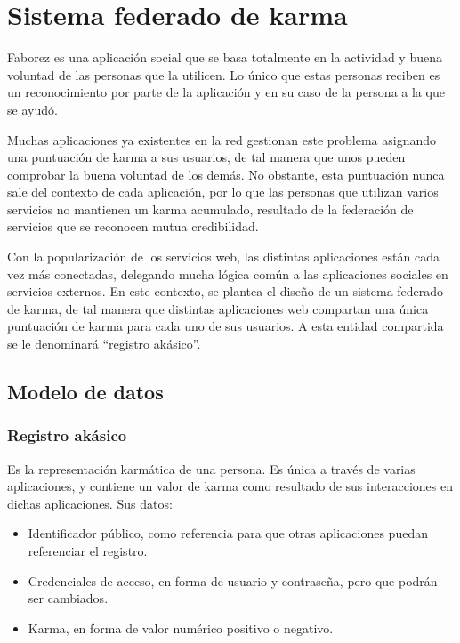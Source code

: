 \documentclass[main]{subfiles}
\begin{document}
\chapter{Sistema federado de karma}
\label{sec:karma}

Faborez es una aplicación social que se basa totalmente en la actividad y buena voluntad de las personas que la utilicen. Lo único que estas personas reciben es un reconocimiento por parte de la aplicación y en su caso de la persona a la que se ayudó.

Muchas aplicaciones ya existentes en la red gestionan este problema asignando una puntuación de karma a sus usuarios, de tal manera que unos pueden comprobar la buena voluntad de los demás. No obstante, esta puntuación nunca sale del contexto de cada aplicación, por lo que las personas que utilizan varios servicios no mantienen un karma acumulado, resultado de la federación de servicios que se reconocen mutua credibilidad.

Con la popularización de los servicios web, las distintas aplicaciones están cada vez más conectadas, delegando mucha lógica común a las aplicaciones sociales en servicios externos. En este contexto, se plantea el diseño de un sistema federado de karma, de tal manera que distintas aplicaciones web compartan una única puntuación de karma para cada uno de sus usuarios. A esta entidad compartida se le denominará \enquote{registro akásico}.

\section{Modelo de datos}

\subsection*{Registro akásico}
Es la representación karmática de una persona. Es única a través de varias aplicaciones, y contiene un valor de karma como resultado de sus interacciones en dichas aplicaciones. Sus datos:

\begin{itemize}
  \item Identificador público, como referencia para que otras aplicaciones puedan referenciar el registro.
  \item Credenciales de acceso, en forma de usuario y contraseña, pero que podrán ser cambiados.
  \item Karma, en forma de valor numérico positivo o negativo.
\end{itemize}
\end{document}

